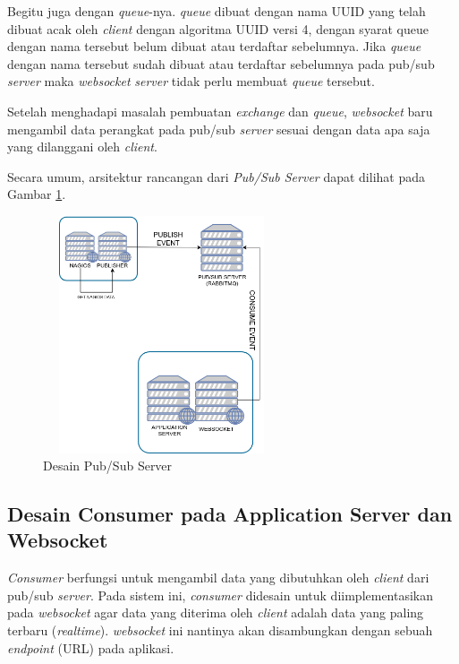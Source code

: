 			Begitu juga dengan \textit{queue}-nya. \textit{queue} dibuat dengan nama UUID yang telah dibuat acak oleh \textit{client} dengan algoritma UUID versi 4, dengan syarat queue dengan nama tersebut belum dibuat atau terdaftar sebelumnya. Jika \textit{queue} dengan nama tersebut sudah dibuat atau terdaftar sebelumnya pada pub/sub \textit{server} maka \textit{websocket} \textit{server} tidak perlu membuat \textit{queue} tersebut.
			
	 		Setelah menghadapi masalah pembuatan \textit{exchange} dan \textit{queue}, \textit{websocket} baru mengambil data perangkat pada pub/sub \textit{server} sesuai dengan data apa saja yang dilanggani oleh \textit{client}.
	 		
        	Secara umum, arsitektur rancangan dari \textit{Pub/Sub Server} dapat dilihat pada Gambar \ref{desain:desainpubsub}.
        	\begin{figure}[H]
				\centering
				\includegraphics[width=7cm,height=7cm]{Images/C-3/desainpubsub.png}
				\caption{Desain Pub/Sub Server}
				\label{desain:desainpubsub}
			\end{figure}
		
		\subsection{Desain Consumer pada Application Server dan Websocket}
			\textit{Consumer} berfungsi untuk mengambil data yang dibutuhkan oleh \textit{client} dari pub/sub \textit{server}. Pada sistem ini, \textit{consumer} didesain untuk diimplementasikan pada \textit{websocket} agar data yang diterima oleh \textit{client} adalah data yang paling terbaru (\textit{realtime}). \textit{websocket} ini nantinya akan disambungkan dengan sebuah \textit{endpoint} (URL) pada aplikasi.
			
